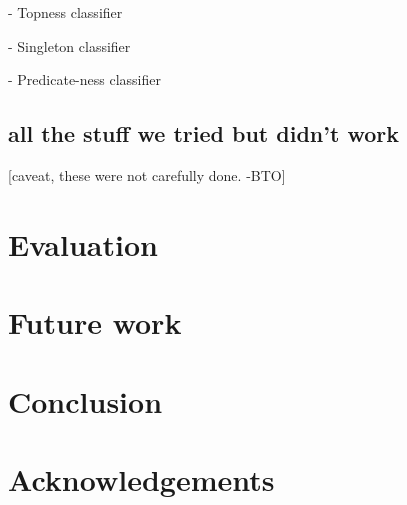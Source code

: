 \documentclass[11pt]{article}
\newcommand{\bocomment}[1]{\textcolor{Bittersweet}{[#1 -BTO]}}
\begin{document}
 - Topness classifier

 - Singleton classifier

 - Predicate-ness classifier


\subsection{all the stuff we tried but didn't work}

\bocomment{caveat, these were not carefully done.}


\section{Evaluation}
\label{s:datasplits}

\section{Future work}

\section{Conclusion}

\nocite{flanigan-etal:ACL2014}



\section*{Acknowledgements}



\end{document}
